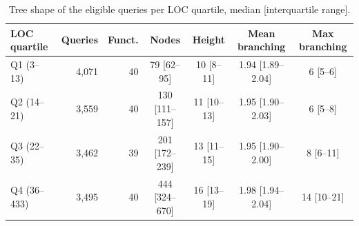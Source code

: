 \begin{table}[!htbp]
\centering
\caption{Tree shape of the eligible queries per LOC quartile, median [interquartile range].}
\label{tab:d1}
\scriptsize
\setlength{\tabcolsep}{2.5pt}
\begin{tabular}{lrrcccc}
\toprule
LOC quartile & Queries & Funct. & Nodes & Height & Mean branching & Max branching \\
\midrule
Q1 (3--13) & 4,071 & 40 & 79 [62--95] & 10 [8--11] & 1.94 [1.89--2.04] & 6 [5--6] \\
Q2 (14--21) & 3,559 & 40 & 130 [111--157] & 11 [10--13] & 1.95 [1.90--2.03] & 6 [5--8] \\
Q3 (22--35) & 3,462 & 39 & 201 [172--239] & 13 [11--15] & 1.95 [1.90--2.00] & 8 [6--11] \\
Q4 (36--433) & 3,495 & 40 & 444 [324--670] & 16 [13--19] & 1.98 [1.94--2.04] & 14 [10--21] \\
\bottomrule
\end{tabular}
\end{table}
